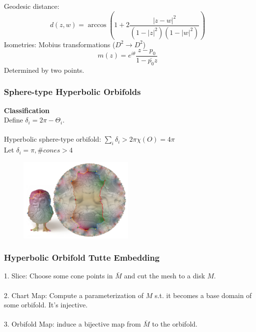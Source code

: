 \documentclass{beamer}
\begin{document}
\begin{frame}
Geodesic distance:
$$d(z, w) = \arccos(1 + 2\frac{|z - w|^2}{(1 - |z|^2)(1 - |w|^2)})$$
Isometries: Mobius transformations ($D^2\rightarrow D^2$)
$$m(z) = e^{i\theta}\frac{z - p_0}{1 - \bar{p_0}z}$$
Determined by two  points.
\end{frame}


\begin{frame}
\frametitle{Sphere-type Hyperbolic Orbifolds}
\textbf{Classification}\\
Define $\delta_i = 2\pi - \Theta_i.$\\
~\\ 
Hyperbolic sphere-type orbifold: $\sum_i \delta_i > 2\pi \chi(\mathit{O}) = 4\pi$\\
Let $\delta_i = \pi, \#cones > 4$

\begin{figure}
\includegraphics[width=0.5\textwidth]{images/hyperbolic-orbifold.png}
\end{figure}
\end{frame}

\begin{frame}
\frametitle{Hyperbolic Orbifold Tutte Embedding}
1. Slice: Choose some cone points in $\bar{M}$ and cut the mesh to a disk $M$.\\
~\\
2. Chart Map: Compute a parameterization of $M$ s.t. it becomes a base domain of some orbifold. It's injective.\\
~\\
3. Orbifold Map: induce a bijective map from $\bar{M}$ to the orbifold.
\end{frame}
\end{document}
